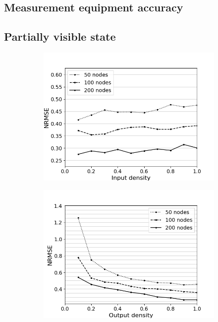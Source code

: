 \subsection{Measurement equipment accuracy}

\subsection{Partially visible state}

\begin{figure}[htbp]
  \centering
  \begin{subfigure}{.3\textwidth}
    \centering
    \includegraphics[width=\linewidth]{img/input_density_all.png}
  \end{subfigure}
  \begin{subfigure}{.3\textwidth}
    \centering
    \includegraphics[width=\linewidth]{img/output_density_all.png}

\end{subfigure}
\end{figure}
